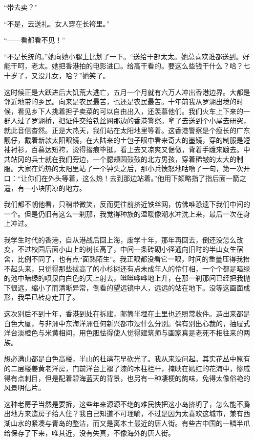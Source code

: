 \par “带去卖？”
\par “不是，去送礼。女人穿在长袴里。”
\par “——看都看不见！”
\par “不是长统的。”她向她小腿上比划了一下。“送给干部太太。她总喜欢谁都送到。好能干呵，老太。她把香港拍的电影进口。给高干看的。要这么些钱干什么？哈？七十岁了，又没儿女，哈？”她笑了。
\par 这时候正是大跃进后大饥荒大逃亡，五月一个月就有六万人冲出香港边界。大都是邻近地带的乡民。向来是农民最苦，也还是农民最苦。十年前我从罗湖出境的时候，看见乡下人挑着担子卖菜的可以自由出入，还羡慕他们。我们火车上下来的一群人过了罗湖桥，把证件交给铁丝网那边的香港警察。拿了去送到个小屋去研究，就此音信杳然。正是大热天，我们站在太阳地里等着。这香港警察是个瘦长的广东靓仔，戴着新款太阳眼镜，在大陆来的土包子眼中看来奇大的墨镜，穿的制服是短袖衬衫，百慕达短袴，烫得摺痕毕挺，看上去又凉爽又倨傲，背着手踱来踱去。中共站冈的兵士就在我们旁边，一个腮颊圆鼓鼓的北方男孩，穿着稀皱的太大的制服。大家在灼热的太阳里站了一个钟头之后，那小兵愤怒地咕噜了一句，第一次开口：“让你们在外头等着，这么热！去到那边站着。”他用下颏略指了指后面一箭之遥，有一小块阴凉的地方。
\par 我们都不朝他看，只稍带微笑，反而更往前挤近铁丝网，仿佛唯恐遗下我们中间的一个。但是仍旧有这么一刹那，我觉得种族的温暖像潮水冲洗上来，最后一次在身上冲过。
\par 我学生时代的香港，自从港战后回上海，废学十年，那年再回去，倒还没怎么改变，不过校园后面小山上的树长高了，中间一条砖砌小径通向旧时的半山女生宿舍，比例不同了，也有点“面熟陌生”。我正眼都没看它一眼，时间的重量压得我抬不起头来，只觉得那些拔高了的小杉树还有点未成年人的伶仃相，一个个都是暗绿的池中暗绿的喷泉向白色的天上射去，咝咝哗哗地上升，在那一刹那间已经把我抛下很远，缩小了而清晰异常，倒看的望远镜中人，远远的站在地下。没等这画面成形，我早已转身走开了。
\par 这次别后不到十年，香港到处在拆建，邮筒半埋在土里也还照常收件。造出来都是白色大厦，与非洲中东海洋洲任何新兴都市没什么分别。偶有别出心裁的，抽屉式洋台淡橙色与米黄相间，用色胆怯得使人觉得建筑师与画家真是老死不相往来的两族。
\par 想必满山都是白色高楼，半山的杜鹃花早砍光了。我从来没问起。其实花丛中原有的二层楼姜黄老洋房，门前洋台上褪了漆的木柱栏杆，掩映在嫣红的花海中，惨戚得有点刺目，但是配着碧海蓝天的背景，也另有一种凄梗的韵味，免得太像俗艳的风景明信片。
\par 这种老房子当然是要拆，这些年来源源不绝的难民快把这小岛挤坍了，怎么能不腾出地方来造房子给人住？我自己知道不可理喻，不过是因为太喜欢这城市，兼有西湖山水的紧凑与青岛的整洁，而又是离本土最近的唐人街。有些古中国的一鳞半爪给保存了下来，唯其近，没有失真，不像海外的唐人街。
